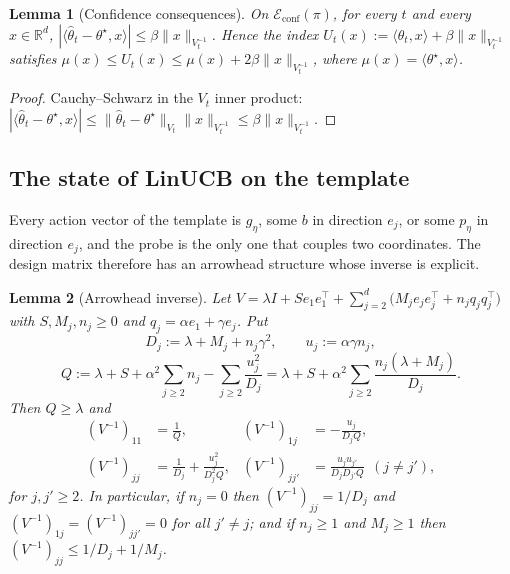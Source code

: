 \documentclass{article}
\newtheorem{lemma}{Lemma}
\theoremstyle{definition}
\theoremstyle{remark}
\newcommand{\R}{\mathbb{R}}
\theoremstyle{remark}
\begin{document}
\begin{lemma}[Confidence consequences]
\label{lem:cat-conf}
On $\mathcal E_{\mathrm{conf}}(\pi)$, for every $t$ and every $x\in\R^d$,
$|\langle\widehat\theta_t-\theta^\star,x\rangle|\le\beta\|x\|_{V_t^{-1}}$.
Hence the index $U_t(x):=\langle\widehat\theta_t,x\rangle+\beta\|x\|_{V_t^{-1}}$
satisfies $\mu(x)\le U_t(x)\le\mu(x)+2\beta\|x\|_{V_t^{-1}}$, where
$\mu(x)=\langle\theta^\star,x\rangle$.
\end{lemma}

\begin{proof}
Cauchy--Schwarz in the $V_t$ inner product:
$|\langle\widehat\theta_t-\theta^\star,x\rangle|\le\|\widehat\theta_t-\theta^\star\|_{V_t}\|x\|_{V_t^{-1}}\le\beta\|x\|_{V_t^{-1}}$.
\end{proof}

\subsection{The state of LinUCB on the template}

Every action vector of the template is $g_\eta$, some $b$ in direction $e_j$,
or some $p_\eta$ in direction $e_j$, and the probe is the only one that couples
two coordinates. The design matrix therefore has an arrowhead structure whose
inverse is explicit.

\begin{lemma}[Arrowhead inverse]
\label{lem:arrowhead}
Let $V=\lambda I+Se_1e_1^\top+\sum_{j=2}^{d}\bigl(M_je_je_j^\top+n_jq_jq_j^\top\bigr)$
with $S,M_j,n_j\ge0$ and $q_j=\alpha e_1+\gamma e_j$. Put
\[
D_j:=\lambda+M_j+n_j\gamma^2,\qquad u_j:=\alpha \gamma n_j,
\]
\[
Q:=\lambda+S+\alpha^2\sum_{j\ge2}n_j-\sum_{j\ge2}\frac{u_j^2}{D_j}
=\lambda+S+\alpha^2\sum_{j\ge2}\frac{n_j(\lambda+M_j)}{D_j}.
\]
Then $Q\ge\lambda$ and
\begin{align*}
(V^{-1})_{11}&=\frac1Q,&
(V^{-1})_{1j}&=-\frac{u_j}{D_jQ},\\
(V^{-1})_{jj}&=\frac1{D_j}+\frac{u_j^2}{D_j^2Q},&
(V^{-1})_{jj'}&=\frac{u_ju_{j'}}{D_jD_{j'}Q}\ \ (j\ne j'),
\end{align*}
for $j,j'\ge2$. In particular, if $n_j=0$ then
$(V^{-1})_{jj}=1/D_j$ and $(V^{-1})_{1j}=(V^{-1})_{jj'}=0$ for all $j'\ne j$; and
if $n_j\ge1$ and $M_j\ge1$ then $(V^{-1})_{jj}\le 1/D_j+1/M_j$.
\end{lemma}
\end{document}
